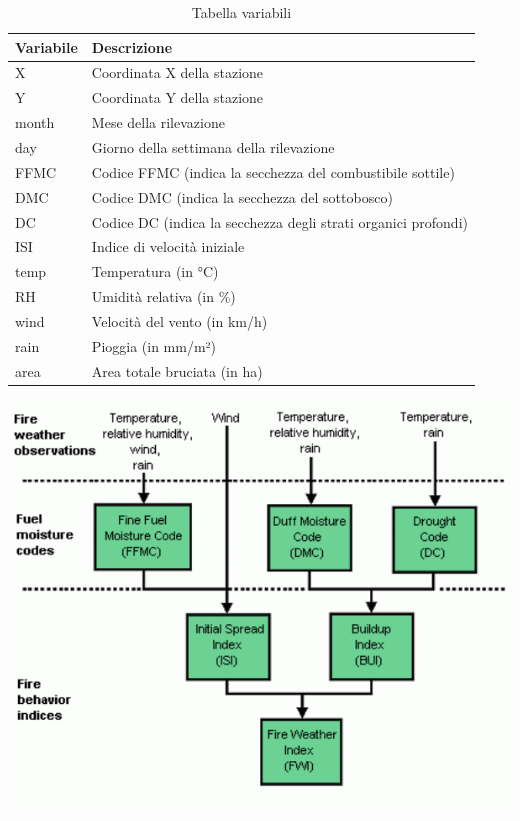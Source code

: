 \documentclass[
]{article}
\begin{document}
\begin{table}[H]
\centering
\caption{\label{tab:unnamed-chunk-1}Tabella variabili}
\centering
\begin{tabular}[t]{l|l}
\hline
Variabile & Descrizione\\
\hline
X & Coordinata X della stazione\\
\hline
Y & Coordinata Y della stazione\\
\hline
month & Mese della rilevazione\\
\hline
day & Giorno della settimana della rilevazione\\
\hline
FFMC & Codice FFMC (indica la secchezza del combustibile sottile)\\
\hline
DMC & Codice DMC (indica la secchezza del sottobosco)\\
\hline
DC & Codice DC (indica la secchezza degli strati organici profondi)\\
\hline
ISI & Indice di velocità iniziale\\
\hline
temp & Temperatura (in °C)\\
\hline
RH & Umidità relativa (in \%)\\
\hline
wind & Velocità del vento (in km/h)\\
\hline
rain & Pioggia (in mm/m²)\\
\hline
area & Area totale bruciata (in ha)\\
\hline
\end{tabular}
\end{table}

\begin{center}\includegraphics{ForestFires_files/figure-latex/unnamed-chunk-2-1} \end{center}
\end{document}
